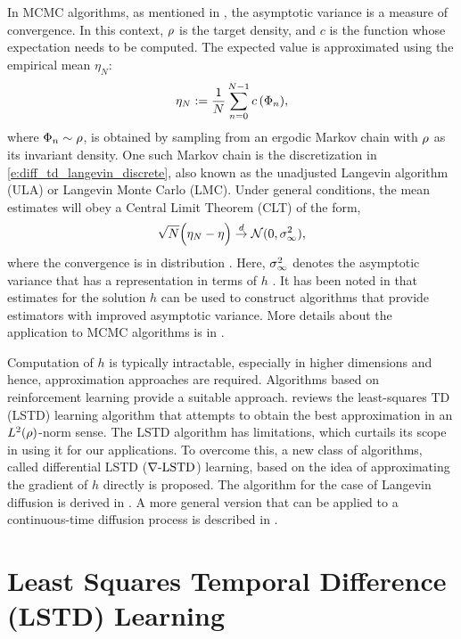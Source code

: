 In MCMC algorithms, as mentioned in , the asymptotic variance is a measure of convergence. In this context, $\rho$ is the target density, and $c$ is the function whose expectation needs to be computed. The expected value is approximated using the empirical mean $\eta_N$:
\begin{equation} \eta_N := \frac{1}{N} \sum_{n=0}^{N-1} c\,(\Phi_n),\end{equation}
where $\Phi_n \sim \rho$, is obtained by sampling from an ergodic Markov chain with $\rho$ as its invariant density. One such Markov chain is the discretization in \eqref{e:diff_td_langevin_discrete}, also known as the unadjusted Langevin algorithm (ULA) or Langevin Monte Carlo (LMC). Under general conditions, the mean estimates will obey a Central Limit Theorem (CLT) of the form,
\begin{equation}
\sqrt{N} \Bigl( \eta_N - \eta \Bigr) \overset{d}{\to} \mathcal{N}(0,\sigma_\infty ^2),
\end{equation}
where the convergence is in distribution \cite{MT,bha82}. Here, $\sigma_\infty^2$ denotes the asymptotic variance that has a representation in terms of $h$ \cite{glymey96a,MT,asmgly07}. It has been noted in \cite{henthesis97, delkon12} that estimates for the solution $h$ can be used to construct algorithms that provide estimators with improved asymptotic variance. More details about the application to MCMC algorithms is in . 

Computation of $h$ is typically intractable, especially in higher dimensions and hence, approximation approaches are required. Algorithms based on reinforcement learning provide a suitable approach.  reviews the least-squares TD (LSTD) learning algorithm that attempts to obtain the best approximation in an $L^2(\rho)$-norm sense. The LSTD algorithm has limitations, which curtails its scope in using it for our applications. To overcome this, a new class of algorithms, called differential LSTD ($\nabla\text{-LSTD}$) learning, based on the idea of approximating the gradient of $h$ directly is proposed. The algorithm for the case of Langevin diffusion is derived in .  A more general version that can be applied to a continuous-time diffusion process is described in . 

\section{Least Squares Temporal Difference (LSTD) Learning} 
\label{s:lstd}
